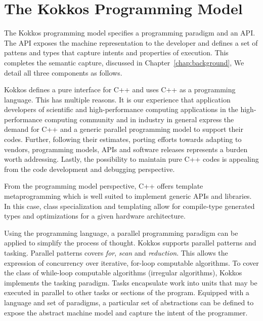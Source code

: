 \section{The Kokkos Programming Model}\label{chap:kokkosPM}

The Kokkos programming model specifies a programming paradigm and an API. The API exposes the machine representation to the developer and defines a set of pattens and types that capture intents and properties of execution. This completes the semantic capture, discussed in Chapter~\ref{chap:background}, We detail all three components as follows.

Kokkos defines a pure interface for C++ and uses C++ as a programming language. This has multiple reasons. It is our experience that application developers of scientific and high-performance computing applications in the high-performance computing community and in industry in general express the demand for C++ and a generic parallel programming model to support their codes. Further, following their estimates, porting efforts towards adapting to vendors, programming models, APIs and software releases represents a burden worth addressing. Lastly, the possibility to maintain pure C++ codes is appealing from the code development and debugging perspective. 

From the programming model perspective, C++ offers template metaprogramming which is well suited to implement generic APIs and libraries. In this case, class specialization and templating allow for compile-type generated types and optimizations for a given hardware architecture. 

Using the programming language, a parallel programming paradigm can be applied to simplify the process of thought. Kokkos supports parallel patterns and tasking. Parallel patterns covers \emph{for}, \emph{scan} and \emph{reduction}. This allows the expression of concurrency over iterative, for-loop computable algorithms. To cover the class of while-loop computable algorithms (irregular algorithms), Kokkos implements the tasking paradigm. Tasks encapsulate work into units that may be executed in parallel to other tasks or sections of the program. Equipped with a language and set of paradigms, a particular set of abstractions can be defined to expose the abstract machine model and capture the intent of the programmer.

